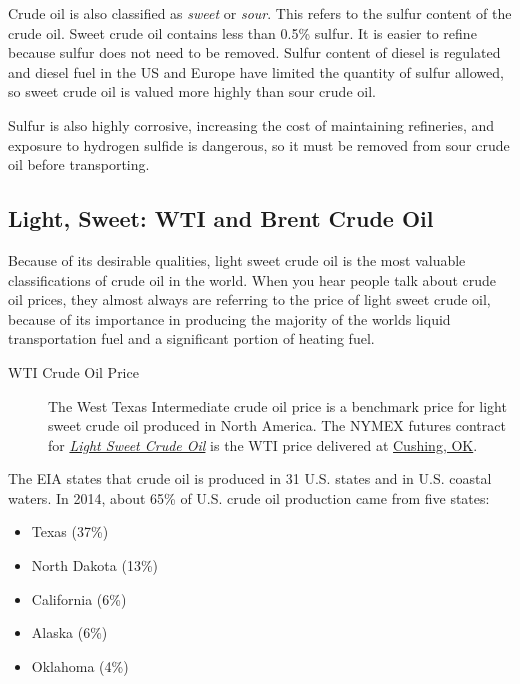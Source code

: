 \documentclass[
  letterpaper,
  DIV=11,
  numbers=noendperiod]{scrreprt}
\providecommand{\tightlist}{%
  \setlength{\itemsep}{0pt}\setlength{\parskip}{0pt}}\usepackage{longtable,booktabs,array}
\begin{document}
Crude oil is also classified as \emph{sweet} or \emph{sour}. This refers
to the sulfur content of the crude oil. Sweet crude oil contains less
than 0.5\% sulfur. It is easier to refine because sulfur does not need
to be removed. Sulfur content of diesel is regulated and diesel fuel in
the US and Europe have limited the quantity of sulfur allowed, so sweet
crude oil is valued more highly than sour crude oil.

Sulfur is also highly corrosive, increasing the cost of maintaining
refineries, and exposure to hydrogen sulfide is dangerous, so it must be
removed from sour crude oil before transporting.

\subsection{Light, Sweet: WTI and Brent Crude
Oil}\label{light-sweet-wti-and-brent-crude-oil}

Because of its desirable qualities, light sweet crude oil is the most
valuable classifications of crude oil in the world. When you hear people
talk about crude oil prices, they almost always are referring to the
price of light sweet crude oil, because of its importance in producing
the majority of the worlds liquid transportation fuel and a significant
portion of heating fuel.

\begin{description}
\item[WTI Crude Oil Price]
The West Texas Intermediate crude oil price is a benchmark price for
light sweet crude oil produced in North America. The NYMEX futures
contract for
\href{http://www.cmegroup.com/trading/energy/crude-oil/light-sweet-crude.html}{\emph{Light
Sweet Crude Oil}} is the WTI price delivered at
\href{https://www.google.com/maps/place/Cushing,+OK+74023/@43.8498418,-87.2836175,5.17z/data=!4m2!3m1!1s0x87b169f80014c5c1:0xfe855f1914b195a}{Cushing,
OK}.
\end{description}

The EIA states that crude oil is produced in 31 U.S. states and in U.S.
coastal waters. In 2014, about 65\% of U.S. crude oil production came
from five states:

\begin{itemize}
\tightlist
\item
  Texas (37\%)
\item
  North Dakota (13\%)
\item
  California (6\%)
\item
  Alaska (6\%)
\item
  Oklahoma (4\%)
\end{itemize}
\end{document}
